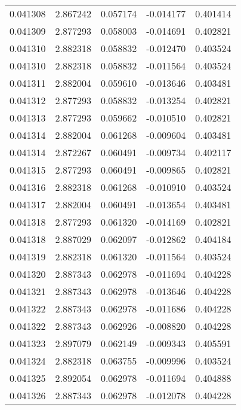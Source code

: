 \begin{tabular}{lrrrr}
0.041308    &  2.867242 &  0.057174 & -0.014177 &             0.401414 \\
0.041309    &  2.877293 &  0.058003 & -0.014691 &             0.402821 \\
0.041310    &  2.882318 &  0.058832 & -0.012470 &             0.403524 \\
0.041310    &  2.882318 &  0.058832 & -0.011564 &             0.403524 \\
0.041311    &  2.882004 &  0.059610 & -0.013646 &             0.403481 \\
0.041312    &  2.877293 &  0.058832 & -0.013254 &             0.402821 \\
0.041313    &  2.877293 &  0.059662 & -0.010510 &             0.402821 \\
0.041314    &  2.882004 &  0.061268 & -0.009604 &             0.403481 \\
0.041314    &  2.872267 &  0.060491 & -0.009734 &             0.402117 \\
0.041315    &  2.877293 &  0.060491 & -0.009865 &             0.402821 \\
0.041316    &  2.882318 &  0.061268 & -0.010910 &             0.403524 \\
0.041317    &  2.882004 &  0.060491 & -0.013654 &             0.403481 \\
0.041318    &  2.877293 &  0.061320 & -0.014169 &             0.402821 \\
0.041318    &  2.887029 &  0.062097 & -0.012862 &             0.404184 \\
0.041319    &  2.882318 &  0.061320 & -0.011564 &             0.403524 \\
0.041320    &  2.887343 &  0.062978 & -0.011694 &             0.404228 \\
0.041321    &  2.887343 &  0.062978 & -0.013646 &             0.404228 \\
0.041322    &  2.887343 &  0.062978 & -0.011686 &             0.404228 \\
0.041322    &  2.887343 &  0.062926 & -0.008820 &             0.404228 \\
0.041323    &  2.897079 &  0.062149 & -0.009343 &             0.405591 \\
0.041324    &  2.882318 &  0.063755 & -0.009996 &             0.403524 \\
0.041325    &  2.892054 &  0.062978 & -0.011694 &             0.404888 \\
0.041326    &  2.887343 &  0.062978 & -0.012078 &             0.404228 \\

\end{tabular}
